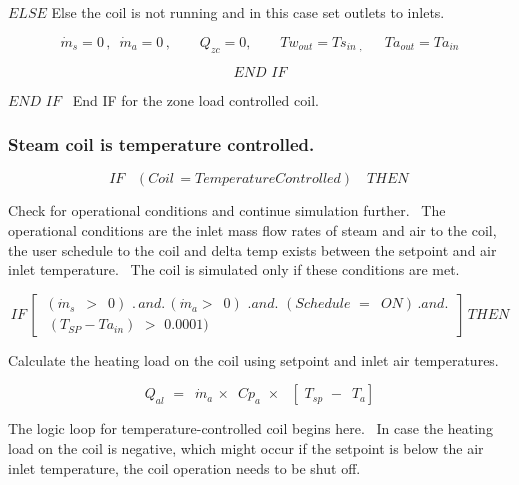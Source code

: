 \(ELSE\) Else the coil is not running and in this case set outlets to inlets.

\begin{equation}
{\dot m_s} = 0\,,\,\,\,{\dot m_a} = 0\,,\,\,\,\,\,\,\,\,\,\,\,\,{Q_{zc}} = 0,\,\,\,\,\,\,\,\,\,\,\,\,T{w_{out}} = T{s_{in\,\,,\,\,\,\,}}\,\,\,\,\,\,T{a_{out}} = T{a_{in}}
\end{equation}

\begin{equation}
END\,\,IF
\end{equation}

\(END\,\,IF\) ~End IF for the zone load controlled coil.

\subsubsection{Steam coil is temperature controlled.}\label{steam-coil-is-temperature-controlled.}

\begin{equation}
IF\,\,\,\,\,(Coil\, = TemperatureControlled)\,\,\,\,\,\,THEN\,
\end{equation}

Check for operational conditions and continue simulation further.~ The operational conditions are the inlet mass flow rates of steam and air to the coil, the user schedule to the coil and delta temp exists between the setpoint and air inlet temperature.~ The coil is simulated only if these conditions are met.

\begin{equation}
IF\,\left[ \begin{array}{l}\,({{\dot m}_s}\,\,\, > \,\,\,0)\,\,.\,and.\,({{\dot m}_a} > \,\,\,0)\,\,.and.\,\,(Schedule\,\, = \,\,\,ON)\,.and.\,\\\,\,({T_{SP}} - T{a_{in}})\,\, > \,\,0.0001)\,\end{array} \right]\,THEN
\end{equation}

Calculate the heating load on the coil using setpoint and inlet air temperatures.

\begin{equation}
{Q_{al}}\,\, = \,\,\,{\dot m_a}\, \times \,\,\,C{p_a}\,\, \times \,\,\,\,[\,\,{T_{sp}}\,\, - \,\,\,{T_a}]
\end{equation}

The logic loop for temperature-controlled coil begins here.~ In case the heating load on the coil is negative, which might occur if the setpoint is below the air inlet temperature, the coil operation needs to be shut off.

